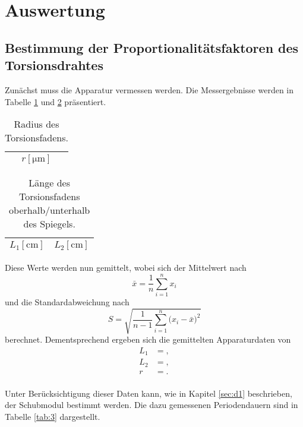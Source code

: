 \section{Auswertung}
\label{sec:Auswertung}
\subsection{Bestimmung der Proportionalitätsfaktoren des Torsionsdrahtes}
Zunächst muss die Apparatur vermessen werden.
Die Messergebnisse werden in Tabelle \ref{tab:1} und \ref{tab:2} präsentiert.

\begin{table}[H]
  \centering
  \caption{Radius des Torsionsfadens.}
  \label{tab:1}
  \begin{tabular}{c}
    \toprule
    {$r [\si{\micro\metre}]$}\\
    \midrule
    
    \bottomrule
  \end{tabular}
\end{table}

\begin{table}[H]
  \centering
  \caption{Länge des Torsionsfadens oberhalb/unterhalb des Spiegels.}
  \label{tab:2}
  \begin{tabular}{c c}
    \toprule
    {$L_1 [\si{\centi\metre}]$} & {$L_2 [\si{\centi\metre}]$}\\
    \midrule
    
    \bottomrule
  \end{tabular}
\end{table}


Diese Werte werden nun gemittelt, wobei sich der Mittelwert nach
\begin{equation}
  \bar{x} = \frac{1}{n} \sum_{i=1}^n x_i
\end{equation}
und die Standardabweichung nach
\begin{equation}
  S = \sqrt{ \frac{1}{n-1} \sum_{i=1}^n  \bigl(x_i - \bar{x} \bigr)^2  }
\end{equation}
berechnet.
Dementsprechend ergeben sich die gemittelten Apparaturdaten von
\begin{align*}
  L_1 &= ,\\
  L_2 &= ,\\
  r &= .\\
\end{align*}

Unter Berücksichtigung dieser Daten kann, wie in Kapitel \ref{sec:d1} beschrieben, der Schubmodul bestimmt werden.
Die dazu gemessenen Periodendauern sind in Tabelle \ref{tab:3} dargestellt.

